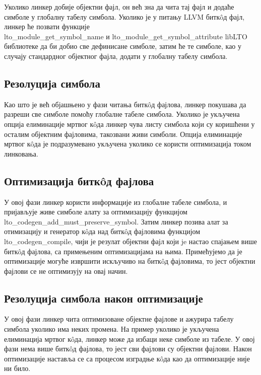 \documentclass[12pt,oneside]{memoir}
\begin{document}
Уколико линкер добије
објектни фајл, он већ зна да чита тај фајл и додаће симболе у глобалну табелу симбола.
Уколико је у питању LLVM битк\^{o}д фајл, линкер ће позвати функције \\
lto{\_}module{\_}get{\_}symbol{\_}name и 
lto{\_}module{\_}get{\_}symbol{\_}attribute 
libLTO библиотеке да би добио све дефинисане  симболе, затим ће те симболе, 
као у случају стандардног објектног фајла, додати у глобалну табелу симбола.

\subsection{Резолуција симбола}
Као што је већ објашњено у фази читања битк\^{o}д фајлова, линкер покушава да разреши све симболе помоћу
глобалне табеле симбола.
Уколико је укључена опција елиминације мртвог к\^{o}да линкер чува листу симбола који
су коришћени у осталим објектним фајловима, такозвани живи симболи.
Опција елиминације мртвог к\^{o}да је подразумевано укључена
уколико се користи оптимизација током линковања.

\subsection{Оптимизација битк\^{o}д фајлова} 
У овој фази линкер користи информације из глобалне табеле симбола, и пријављује
живе симболе алату за оптимизацију функцијом \\
lto{\_}codegen{\_}add{\_}must{\_}preserve{\_}symbol.
Затим линкер позива алат за отимизацију и генератор к\^{o}да над битк\^{o}д фајловима
функцијом lto{\_}codegen{\_}compile, чији је резулат објектни фајл
који je настао спајањем више битк\^{o}д фајлова, са примењеним оптимизацијама на њима.
Примећујемо да је оптимизације могуће извршити искључиво на битк\^{o}д фајловима,
то јест објектни фајлови се не оптимизују на овај начин.

\subsection{Резолуција симбола након оптимизације}
У овој фази линкер чита оптимизоване објектне фајлове и ажурира табелу симбола уколико 
има неких промена. На пример уколико је укључена елиминација мртвог к\^{o}да,
линкер може да избаци неке симболе из табеле.
У овој фази нема више битк\^{o}д фајлова, то јест сви фајлови су објектни фајлови.
Након оптимизације наставља се са процесом изградње к\^{o}да као да оптимизације
није ни било.
\end{document}
